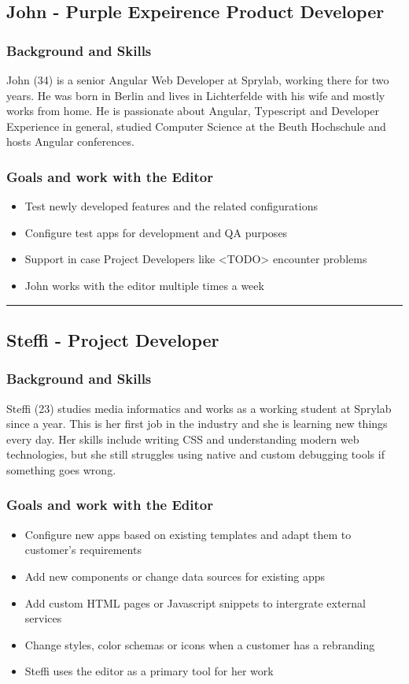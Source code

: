\subsection{John - Purple Expeirence Product Developer}
\subsubsection{Background and Skills}
John (34) is a senior Angular Web Developer at Sprylab, working there for two years. He was born in Berlin and lives in Lichterfelde with his wife and mostly works from home. He is passionate about Angular, Typescript and Developer Experience in general, studied Computer Science at the Beuth Hochschule and hosts Angular conferences.
\\
\subsubsection{Goals and work with the Editor}
\begin{itemize}
  \item Test newly developed features and the related configurations
  \item Configure test apps for development and QA purposes
  \item Support in case Project Developers like <TODO> encounter problems
  \item John works with the editor multiple times a week
\end{itemize}

\hrule
\subsection{Steffi - Project Developer}
\subsubsection{Background and Skills}
Steffi (23) studies media informatics and works as a working student at Sprylab since a year. This is her first job in the industry and she is learning new things every day. Her skills include writing CSS and understanding modern web technologies, but she still struggles using native and custom debugging tools if something goes wrong.  
\\
\subsubsection{Goals and work with the Editor}
\begin{itemize}
  \item Configure new apps based on existing templates and adapt them to customer's requirements
  \item Add new components or change data sources for existing apps
  \item Add custom HTML pages or Javascript snippets to intergrate external services
  \item Change styles, color schemas or icons when a customer has a rebranding
  \item Steffi uses the editor as a primary tool for her work
\end{itemize}

